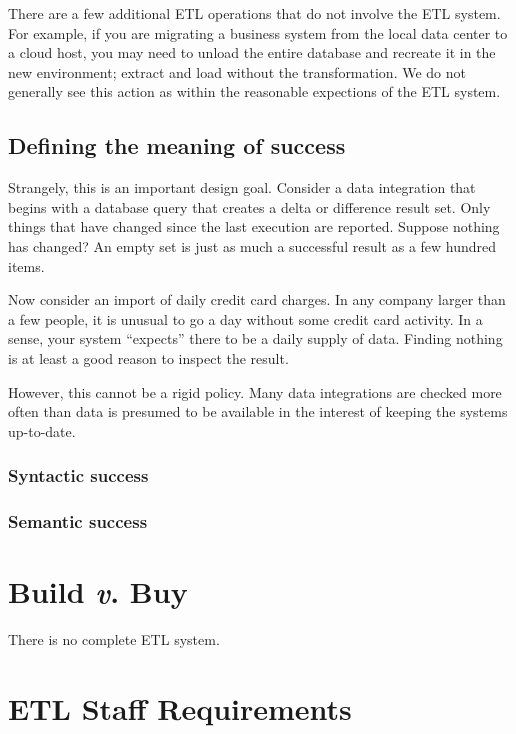 \documentclass[11pt,letterpaper,twosided]{memoir}
\begin{document}
There are a few additional ETL operations that do not involve
the ETL system. For example, if you are migrating a business system
from the local data center to a cloud host, you may need to unload
the entire database and recreate it in the new environment; extract
and load without the transformation. We do not generally see this
action as within the reasonable expections of the ETL system.

\section{Defining the meaning of success}
\label{sec:success}

Strangely, this is an important design goal. Consider a data
integration that begins with a database query that creates a delta
or difference result set. Only things that have changed since the
last execution are reported. Suppose nothing has changed? An empty
set is just as much a successful result as a few hundred items.

Now consider an import of daily credit card charges. In any company 
larger than a few people, it is unusual to go a day without some
credit card activity. In a sense, your system ``expects'' there to
be a daily supply of data. Finding nothing is at least a good
reason to inspect the result.

However, this cannot be a rigid policy. Many data integrations
are checked more often than data is presumed to be available in
the interest of keeping the systems up-to-date. 

\subsection{Syntactic success}

\subsection{Semantic success}



\chapter{Build \emph{v}. Buy}
\label{chap:buildvbuy}

There is no complete ETL system.

\chapter{ETL Staff Requirements}
\label{chap:staffing}
\end{document}

